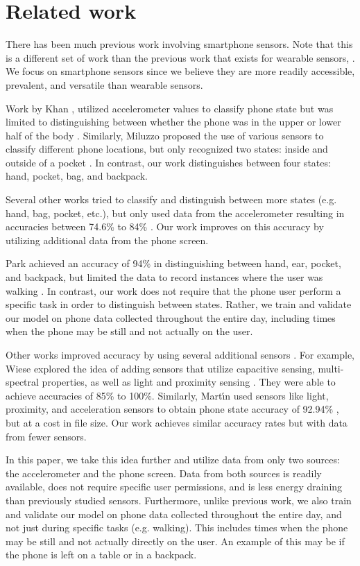 \section{Related work}
There has been much previous work involving smartphone sensors.
Note that this is a different set of work than the previous work that exists for wearable sensors, \cite{Kunze2005,Atallah}.
We focus on smartphone sensors since we believe they are more readily accessible, prevalent, and versatile than wearable sensors.

Work by Khan \et, utilized accelerometer values to classify phone state 
but was limited to distinguishing between whether the phone was in the upper or lower half of the body \cite{Khan2010}.
Similarly, Miluzzo \et proposed the use of various sensors to classify different phone locations, 
but only recognized two states: inside and outside of a pocket \cite{Miluzzo2010}.
In contrast, our work distinguishes between four states: hand, pocket, bag, and backpack. 

Several other works tried to classify and distinguish between more states (e.g. hand, bag, pocket, etc.), but only used data from the accelerometer resulting in accuracies between 74.6\% to 84\% \cite{Fujinami2013,Coksun15}. 
Our work improves on this accuracy by utilizing additional data from the phone screen.

Park \et achieved an accuracy of 94\% in distinguishing between hand, ear, pocket, and backpack, but limited the data to record instances where the user was walking \cite{Park2012}. 
In contrast, our work does not require that the phone user perform a specific task in order to distinguish between states.
Rather, we train and validate our model on phone data collected throughout the entire day, 
 including times when the phone may be still and not actually on the user. 

Other works improved accuracy by using several additional sensors \cite{Yang13}.
For example, Wiese \et explored the idea of adding sensors that utilize capacitive sensing,  multi-spectral properties, as well as light and proximity sensing \cite{Wiese2013}.
They were able to achieve accuracies of 85\% to 100\%.
Similarly, Mart\'{\i}n \et used sensors like light, proximity, and acceleration sensors
to obtain phone state accuracy of 92.94\% \cite{Martin2013}, but at a cost in file size.
Our work achieves similar accuracy rates but with data from fewer sensors.  

In this paper, we take this idea further and utilize data from only two sources: the accelerometer and the phone screen. 
Data from both sources is readily available, does not require specific user permissions, and is less energy draining than previously studied sensors.
Furthermore, unlike previous work, we also train and validate our model on phone data collected throughout the entire day, and not just during specific tasks (e.g. walking).
This includes times when the phone may be still and not actually directly on the user.
An example of this may be if the phone is left on a table or in a backpack. 







